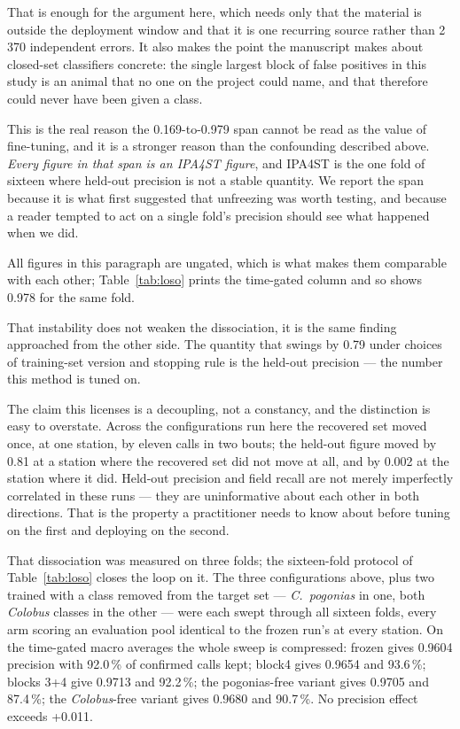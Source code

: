 \documentclass[review,3p,times]{elsarticle}
\begin{document}
That is enough for the argument here, which needs only that the material is
outside the deployment window and that it is one recurring source rather than
2\,370 independent errors. It also makes the point the manuscript makes about
closed-set classifiers concrete: the single largest block of false positives in
this study is an animal that no one on the project could name, and that
therefore could never have been given a class.

This is the real reason the 0.169-to-0.979 span cannot be read as the value of
fine-tuning, and it is a stronger reason than the confounding described above.
\emph{Every figure in that span is an IPA4ST figure}, and IPA4ST is the one fold
of sixteen where held-out precision is not a stable quantity. We report the span
because it is what first suggested that unfreezing was worth testing, and
because a reader tempted to act on a single fold's precision should see what
happened when we did.

All figures in this paragraph are ungated, which is what makes them comparable
with each other; Table~\ref{tab:loso} prints the time-gated column and so shows
0.978 for the same fold.

That instability does not weaken the dissociation, it is the same finding
approached from the other side. The quantity that swings by 0.79 under choices
of training-set version and stopping rule is the held-out precision --- the
number this method is tuned on.

The claim this licenses is a decoupling, not a constancy, and the distinction
is easy to overstate. Across the
configurations run here the recovered set moved once, at one station, by eleven
calls in two bouts; the held-out figure moved by 0.81 at a station where the
recovered set did not move at all, and by 0.002 at the station where it did.
Held-out precision and field recall are not merely imperfectly correlated in
these runs --- they are uninformative about each other in both directions. That
is the property a practitioner needs to know about before tuning on the first
and deploying on the second.

That dissociation was measured on three folds; the sixteen-fold protocol of
Table~\ref{tab:loso} closes the loop on it. The three configurations above,
plus two trained with a class removed from the target set --- \textit{C.\
pogonias} in one, both \textit{Colobus} classes in the other --- were each
swept through all sixteen folds, every arm scoring an evaluation
pool identical to the frozen run's at every station. On the time-gated macro
averages the whole sweep is compressed: frozen gives 0.9604 precision with
92.0\,\% of confirmed calls kept; block4 gives 0.9654 and 93.6\,\%; blocks
3+4 give 0.9713 and 92.2\,\%; the pogonias-free variant gives 0.9705 and
87.4\,\%; the \textit{Colobus}-free variant gives 0.9680 and 90.7\,\%. No
precision effect exceeds +0.011.
\end{document}
